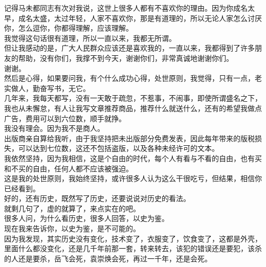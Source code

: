 \begin{multicols}{\theparacolNo}
记得马未都同志有次对我说，这世上很多人都有不喜欢你的理由。因为你成名太早，成名太盛，太过年轻，人家不喜欢你，那是有道理的，所以无论人家怎么讨厌你，怎么逗你，你都得理解，应该理解。\\

我觉得这句话很有道理，所以一直以来，我都无所谓。\\

但让我感动的是，广大人民群众应该还是喜欢我的，一直以来，我都得到了许多朋友的帮助，没有你们，我撑不到今天，谢谢你们，非常真诚地谢谢你们。\\

谢谢。\\

然后是心得，如果要问我，有个什么成功心得，处世原则，我觉得，只有一点，老实做人，勤奋写书，无它。\\

几年来，我每天都写，没有一天敢于疏忽，不惹事，不闹事，即使所谓盛名之下，我也从未懈怠，有人让我写文章推荐商品，推荐什么就送什么，还有的希望我做点广告，费用可以到六位数，顺手就挣。\\

我没有理会。因为我不是商人。\\

出版商亲自算给我听，由于我坚持把未出版部分免费发表，因此每年带来的版税损失，可以达到七位数，这还不包括盗版，以及各种未经许可的文本。\\

我依然坚持，因为我相信，这是个自由的时代，每个人有看与不看的自由，也有买和不买的自由，任何人都不应该被强迫。\\

这是我的处世原则，我始终坚持，或许很多人认为这么干很吃亏，但结果，相信你已经看到。\\

好的，还有历史，既然写了历史，还要说说对历史的看法。\\

就剩几句了，虚的就算了，来点实在的吧。\\

很多人问，为什么看历史，很多人回答，以史为鉴。\\

现在我来告诉你，以史为鉴，是不可能的。\\

因为我发现，其实历史没有变化，技术变了，衣服变了，饮食变了，这都是外壳，里面什么都没变化，还是几千年前那一套，转来转去，该犯的错误还是要犯，该杀的人还是要杀，岳飞会死，袁崇焕会死，再过一千年，还是会死。\\


\end{multicols}
